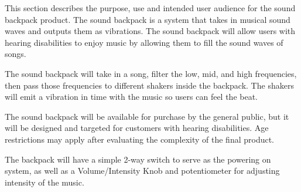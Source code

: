 This section describes the purpose, use and intended user audience for the sound backpack product. The sound backpack is a system that takes in musical sound waves and outputs them as vibrations. The sound backpack will allow users with hearing disabilities to enjoy music by allowing them to fill the sound waves of songs.

The sound backpack will take in a song, filter the low, mid, and high frequencies, then pass those frequencies to different shakers inside the backpack. The shakers will emit a vibration in time with the music so users can feel the beat.

The sound backpack will be available for purchase by the general public, but it will be designed and targeted for customers with hearing disabilities. Age restrictions may apply after evaluating the complexity of the final product.

The backpack will have a simple 2-way switch to serve as the powering on system, as well as a Volume/Intensity Knob and potentiometer for adjusting intensity of the music.
